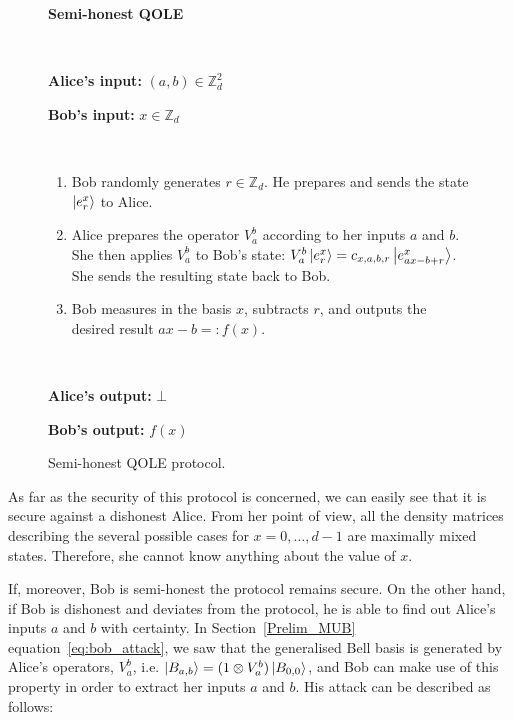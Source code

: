 \begin{figure}[h!]
    \centering
        \begin{tcolorbox}
            
            \centerline{\textbf{Semi-honest QOLE}}
            
            \
            
    		\textbf{Alice's input:} $(a, b) \in \mathbb{Z}^2_d$
    
    		\textbf{Bob's input:} $x \in\mathbb{Z}_d$
            
            \
            
		\begin{enumerate}
        \item Bob  randomly generates $r \in \mathbb{Z}_d$. He prepares and sends the state $\ket{e^x_r}$ to Alice.
        \item Alice prepares the operator $V^b_a$ according to her inputs $a$ and $b$. She then applies $V^b_a$ to Bob's state: $V^b_a \ket{e^x_r} = c_{x,a,b,r} \ket{e^x_{ax - b + r}}$. She sends the resulting state back to Bob. 
        \item Bob measures in the  basis  $x$,  subtracts $r$, and outputs the desired result $ax-b=:f(x)$.
    \end{enumerate}
    
    \
    
    \textbf{Alice's output:} $\bot$
    
    \textbf{Bob's output:} $f(x)$
        
        \end{tcolorbox}
    \caption{Semi-honest QOLE protocol.}
    \label{fig:SH_QOLE}
\end{figure}



As far as the security of this protocol is concerned, we can easily see that it is secure against a dishonest Alice.  From her point of view, all the density matrices describing the several possible cases for $x = 0, \ldots, d-1$  are maximally mixed states. Therefore, she cannot know anything about the value of $x$. 

If, moreover, Bob is semi-honest the protocol remains secure. On the other hand, if Bob is dishonest and deviates from the protocol, he is able to find out Alice's inputs $a$ and $b$ with certainty. %
In Section~\ref{Prelim_MUB} equation~\eqref{eq:bob_attack}, we saw that the generalised Bell basis is generated by Alice's operators, $V^b_a$, i.e. $ \ket{B_{a,b}} = (1 \otimes V^b_a) \ket{B_{0,0}} $,  and Bob can make use of this property in order to extract her inputs $a$ and $b$. His attack can be described as follows:

